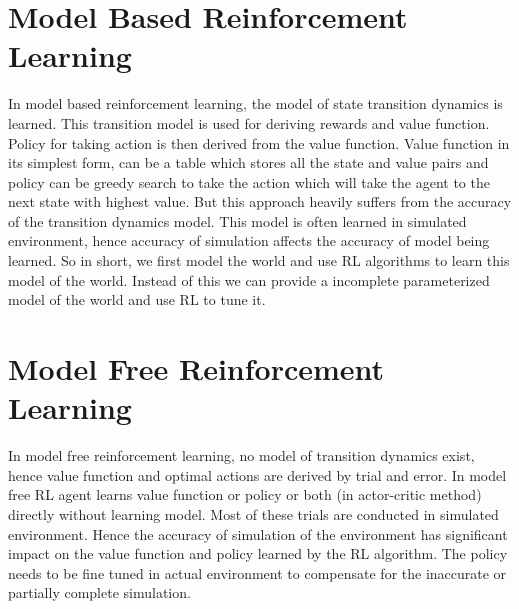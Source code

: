 \documentclass[thesis]{mas_proposal}
\begin{document}
\section{Model Based Reinforcement Learning} \label{mod-RL}
In model based  reinforcement learning, the model of state transition dynamics is learned. This transition model is used for deriving rewards and value function. Policy for taking action is then derived from the value function. Value function in its simplest form, can be a table which stores all the state and value pairs and policy can be greedy search to take the action which will take the agent to the next state with highest value. But this approach heavily suffers from the accuracy of the transition dynamics model. This model is often learned in simulated environment, hence accuracy of simulation affects the accuracy of model being learned. So in short, we first model the world and use RL algorithms to learn this model of the world. Instead of this we can provide a incomplete parameterized model of the world and use RL to tune it.  


\section{Model Free Reinforcement Learning}

In model free reinforcement learning, no model of transition dynamics exist, hence value function and optimal actions are derived by trial and error\cite{polydoros2017survey}. In model free RL agent learns value function or policy or both (in actor-critic method) directly without learning model. Most of these trials are conducted in simulated environment. Hence the accuracy of simulation of the environment has significant impact on the value function and policy learned by the RL algorithm. The policy needs to be fine tuned in actual environment to compensate for the inaccurate or partially complete simulation.
\end{document}
